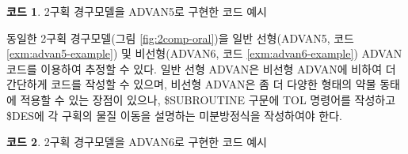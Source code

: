 \documentclass[
  11pt,
  krantz2, a4paper, twoside]{krantz}
\newenvironment{Shaded}{\begin{snugshade}}{\end{snugshade}}
\newcommand{\DataTypeTok}[1]{\textcolor[rgb]{0.13,0.29,0.53}{#1}}
\newcommand{\DecValTok}[1]{\textcolor[rgb]{0.00,0.00,0.81}{#1}}
\newcommand{\NormalTok}[1]{#1}
\theoremstyle{definition}
\theoremstyle{definition}
\newtheorem{example}{코드}[chapter]
\theoremstyle{definition}
\theoremstyle{remark}
\begin{document}
\begin{example}
\protect\hypertarget{exm:advan5-example}{}{\label{exm:advan5-example} }2구획 경구모델을 ADVAN5로 구현한 코드 예시
\end{example}
\vspace{-5ex}

\begin{Shaded}
\end{Shaded}

동일한 2구획 경구모델(그림 \ref{fig:2comp-oral})을 일반 선형(ADVAN5, 코드 \ref{exm:advan5-example}) 및 비선형(ADVAN6, 코드 \ref{exm:advan6-example}) ADVAN 코드를 이용하여 추정할 수 있다. 일반 선형 ADVAN은 비선형 ADVAN에 비하여 더 간단하게 코드를 작성할 수 있으며, 비선형 ADVAN은 좀 더 다양한 형태의 약물 동태에 적용할 수 있는 장점이 있으나, \$SUBROUTINE 구문에 TOL 명령어를 작성하고 \$DES에 각 구획의 물질 이동을 설명하는 미분방정식을 작성하여야 한다.

\begin{example}
\protect\hypertarget{exm:advan6-example}{}{\label{exm:advan6-example} }2구획 경구모델을 ADVAN6로 구현한 코드 예시
\end{example}
\vspace{-5ex}
\end{document}
